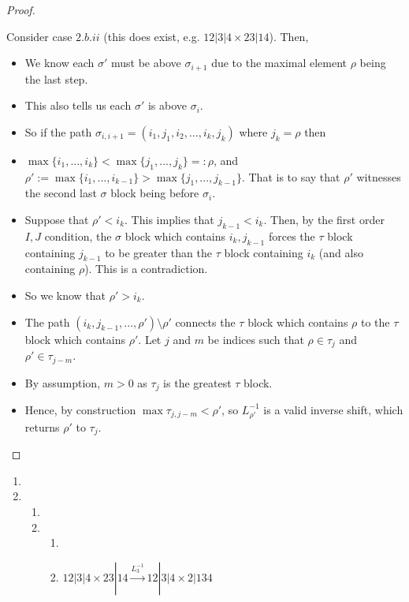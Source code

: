 \begin{proof}
\begin{center}
\end{center}
Consider case $2.b.ii$ (this does exist, e.g. $12|3|4 \times 23|14$). 
Then,
\begin{itemize}
    \item We know each $\sigma'$ must be above $\sigma_{i+1}$ due to the maximal element $\rho$ being the last step.
    \item This also tells us each $\sigma'$ is above $\sigma_i$.
    \item So if the path $\sigma_{i,i+1} = (i_1,j_1,i_2,...,i_{k},j_k)$ where $j_k = \rho$ then
    \item $\max \{i_1,...,i_k\} <\max \{j_1,...,j_k\} =: \rho$, and $\rho':=\max \{i_1,...,i_{k-1}\} > \max \{j_1,...,j_{k-1}\} $. That is to say that $\rho'$ witnesses the second last $\sigma$ block being before $\sigma_i$.
    \item Suppose that $\rho' < i_{k}$. This implies that $j_{k-1}< i_k$. Then, by the first order $I,J$ condition, the $\sigma$ block which contains $i_k,j_{k-1}$ forces the $\tau$ block containing $j_{k-1}$ to be greater than the $\tau$ block containing $i_k$ (and also containing $\rho$). This is a contradiction.
    \item So we know that $\rho'>i_{k}$.
    \item The path $(i_{k},j_{k-1},...,\rho')\setminus \rho'$ connects the $\tau$ block which contains $\rho$  to the $\tau$ block which contains $\rho'$. 
    Let $j$ and $m$ be indices such that $\rho \in \tau_j$ and $\rho' \in \tau_{j-m}$. 
    \item By assumption, $m >0$ as $\tau_j$ is the greatest $\tau$ block.
    \item Hence, by construction $\max \tau_{j,j-m} < \rho'$, so $L_{\rho'}^{-1}$ is a valid inverse shift, which returns $\rho'$ to $\tau_j$.
\end{itemize}
\end{proof}

\begin{example}
\begin{enumerate}
    \item 
    \item 
    \begin{enumerate}
        \item 
        \item 
        \begin{enumerate}
            \item 
            \item $12|3|4\times 23|14 \xrightarrow{L_{3}^{-1}} 12|3|4\times 2|134$ 
        \end{enumerate}
    \end{enumerate}
\end{enumerate}
\end{example}

